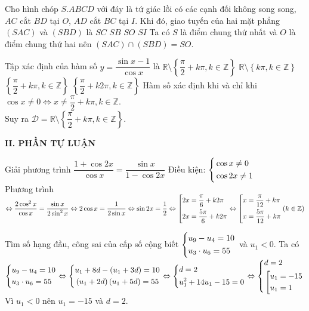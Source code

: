 \begin{ex}%
 Cho hình chóp $S.ABCD$ với đáy là tứ giác lồi có các cạnh đối không song song, $AC$ cắt $BD$ tại $O$, $AD$ cắt $BC$ tại $I$. Khi đó, giao tuyến của hai mặt phẳng $(SAC)$ và $(SBD)$ là
 \choice
  {$SC$}
  {$SB$}
  {\True $SO$}
  {$SI$}
 \loigiai
 {Ta có $S$ là điểm chung thứ nhất và $O$ là điểm chung thứ hai nên $(SAC) \cap (SBD) = SO$.
 }
\end{ex}

\begin{ex}%
 Tập xác định của hàm số $y=\dfrac{\sin{x}-1}{\cos{x}}$ là
 \choice
 {\True $\mathbb{R}\setminus\left\{\dfrac{\pi}{2}+k\pi,k\in\mathbb{Z}\right\}$}
  {$\mathbb{R}\setminus\left\{k\pi,k\in\mathbb{Z}\right\}$}
  {$\left\{\dfrac{\pi}{2}+k\pi,k\in\mathbb{Z}\right\}$}
  {$\left\{\dfrac{\pi}{2}+k2\pi,k\in\mathbb{Z}\right\}$}
 \loigiai
 {Hàm số xác định khi và chỉ khi $\cos x \neq 0 \Leftrightarrow x \neq\dfrac{\pi}{2}+k\pi, k \in \mathbb{Z}$.\\
 Suy ra $\mathscr{D}= \mathbb{R} \setminus \left \{ \dfrac{\pi}{2}+k\pi, k \in \mathbb{Z} \right \}$.
 }
\end{ex}

\noindent\textbf{II. PHẦN TỰ LUẬN}
\begin{bt}%
 Giải phương trình $\dfrac{1+\cos{2x}}{\cos{x}}=\dfrac{\sin{x}}{1-\cos{2x}}$
 \loigiai
 {Điều kiện: $\left\{\begin{aligned}&\cos x \neq0 \\&\cos{2x} \neq
 1\end{aligned}\right.$\\
 Phương trình $\Leftrightarrow \dfrac{2\cos^2{x}}{\cos{x}} = \dfrac{\sin{x}}{2\sin^2{x}}\Leftrightarrow 2\cos{x} = \dfrac{1}{2\sin{x}} \Leftrightarrow \sin{2x}=\dfrac{1}{2}\\  \Leftrightarrow \left[\begin{aligned}&2x=\dfrac{\pi}{6}+k2\pi \\&2x=\dfrac{5\pi}{6}+k2\pi\end{aligned}\right. \Leftrightarrow \left[\begin{aligned}&x=\dfrac{\pi}{12}+k\pi \\&x=\dfrac{5\pi}{12}+k\pi\end{aligned}\right.(k\in \mathbb{Z})$
 }
\end{bt}

\begin{bt}%
 Tìm số hạng đầu, công sai của cấp số cộng biết $\left\{\begin{aligned}&u_9-u_4=10 \\ &u_3 \cdot u_6=55\end{aligned}\right.$ và $u_1<0$.
 \loigiai
 {Ta có $\left\{\begin{aligned}&u_9-u_4=10 \\&u_3 \cdot u_6=55\end{aligned}\right. \Leftrightarrow \left\{\begin{aligned}&u_1+8d-\left(u_1+3d\right)=10 \\&\left(u_1+2d\right)\left(u_1+5d\right)=55\end{aligned}\right. \Leftrightarrow \left\{\begin{aligned}&d=2 \\&u_1^2+14u_1-15=0\end{aligned}\right. \Leftrightarrow \left\{\begin{aligned}&d=2 \\&\left[\begin{aligned}&u_1=-15 \\&u_1=1\end{aligned}\right.\end{aligned}\right.$\\
 Vì $u_1<0$ nên $u_1=-15$ và $d=2$.
 }
\end{bt}


